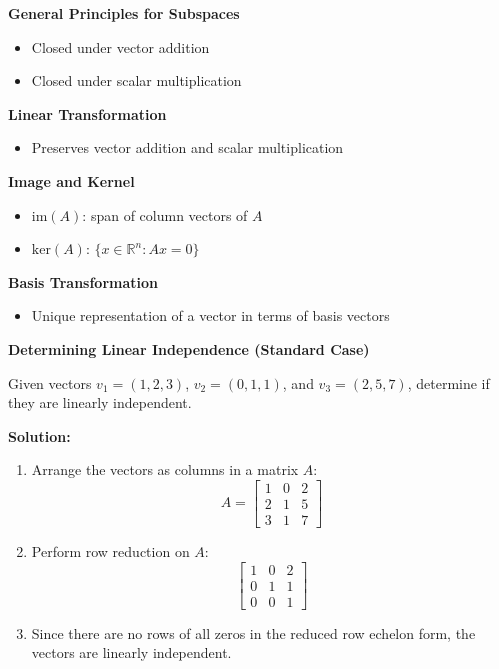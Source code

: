 \documentclass[8pt, a4paper, landscape]{extarticle}
\begin{document}
\begin{multicols*}{5}
  \textbf{General Principles for Subspaces}
  \begin{itemize}
    \item Closed under vector addition
    \item Closed under scalar multiplication
  \end{itemize}

  \textbf{Linear Transformation}
  \begin{itemize}
    \item Preserves vector addition and scalar multiplication
  \end{itemize}

  \textbf{Image and Kernel}
  \begin{itemize}
    \item $\text{im}(A)$: span of column vectors of $A$
    \item $\text{ker}(A)$: $\{x \in \mathbb{R}^n : Ax = 0\}$
  \end{itemize}

  \textbf{Basis Transformation}
  \begin{itemize}
    \item Unique representation of a vector in terms of basis vectors
  \end{itemize}

  \columnbreak

  \textbf{Determining Linear Independence (Standard Case)}

  Given vectors $v_1 = (1, 2, 3)$, $v_2 = (0, 1, 1)$, and $v_3 = (2, 5, 7)$, determine if they are linearly independent.

  \textbf{Solution:}
  \begin{enumerate}
    \item Arrange the vectors as columns in a matrix $A$:
          \[
            A = \begin{bmatrix}
              1 & 0 & 2 \\
              2 & 1 & 5 \\
              3 & 1 & 7
            \end{bmatrix}
          \]
    \item Perform row reduction on $A$:
          \[
            \begin{bmatrix}
              1 & 0 & 2 \\
              0 & 1 & 1 \\
              0 & 0 & 1
            \end{bmatrix}
          \]
    \item Since there are no rows of all zeros in the reduced row echelon form, the vectors are linearly independent.
  \end{enumerate}


\end{multicols*}
\end{document}
